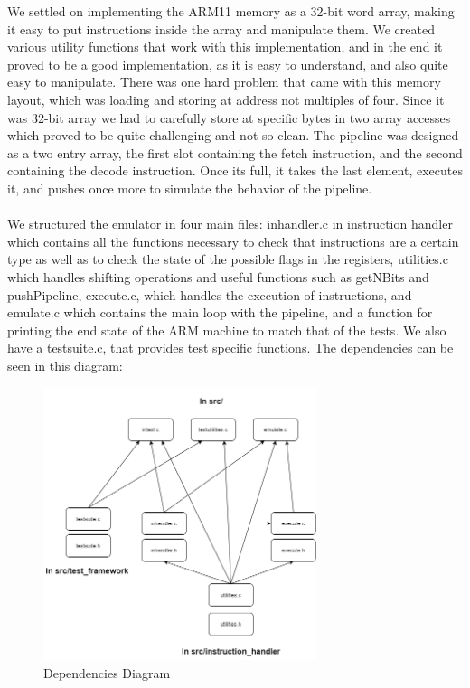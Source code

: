 \documentclass[11pt]{article}
\begin{document}
We settled on implementing the ARM11 memory as a 32-bit word array, making it easy to put instructions inside the array and manipulate them. We created various utility functions that work with this implementation, and in the end it proved to be a good implementation, as it is easy to understand, and also quite easy to manipulate. There was one hard problem that came with this memory layout, which was loading and storing at address not multiples of four. Since it was 32-bit array we had to carefully store at specific bytes in two array accesses which proved to be quite challenging and not so clean. The pipeline was designed as a two entry array, the first slot containing the fetch instruction, and the second containing the decode instruction. Once its full, it takes the last element, executes it, and pushes once more to simulate the behavior of the pipeline. \\ \\

We structured the emulator in four main files: inhandler.c in instruction handler which contains all the functions necessary to check that instructions are a certain type as well as to check the state of the possible flags in the registers, utilities.c which handles shifting operations and useful functions such as getNBits and pushPipeline, execute.c, which handles the execution of instructions, and emulate.c which contains the main loop with the pipeline, and a function for printing the end state of the ARM machine to match that of the tests. We also have a testsuite.c, that provides test specific functions. The dependencies can be seen in this diagram:  \\

\begin{figure}[htp]
    \centering
    \includegraphics[width=8cm]{IncludesDiagram.png}
    \caption{Dependencies Diagram}
    \label{fig:files}
\end{figure}
\end{document}
